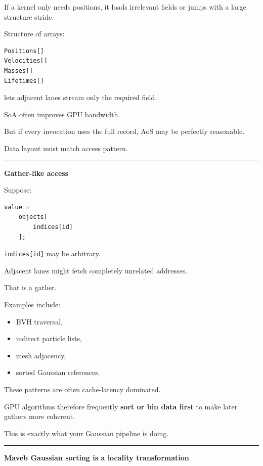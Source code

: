 If a kernel only needs positions, it loads irrelevant fields or jumps with a large structure stride.

Structure of arrays:

\protect{}\label{atbpdt}%
\begin{verbatim}
Positions[]
Velocities[]
Masses[]
Lifetimes[]
\end{verbatim}

lets adjacent lanes stream only the required field.

SoA often improves GPU bandwidth.

But if every invocation uses the full record, AoS may be perfectly reasonable.

Data layout must match access pattern.

\begin{center}\rule{0.5\linewidth}{0.5pt}\end{center}

\textbf{Gather-like access}

Suppose:

\protect{}\label{yx7r08}%
\begin{verbatim}
value =
    objects[
        indices[id]
    ];
\end{verbatim}

\texttt{indices{[}id{]}} may be arbitrary.

Adjacent lanes might fetch completely unrelated addresses.

That is a gather.

Examples include:

\begin{itemize}
\tightlist
\item
  BVH traversal,
\item
  indirect particle lists,
\item
  mesh adjacency,
\item
  sorted Gaussian references.
\end{itemize}

These patterns are often cache-latency dominated.

GPU algorithms therefore frequently \textbf{sort or bin data first} to make later gathers more coherent.

This is exactly what your Gaussian pipeline is doing.

\begin{center}\rule{0.5\linewidth}{0.5pt}\end{center}

\textbf{Maveb Gaussian sorting is a locality transformation}

